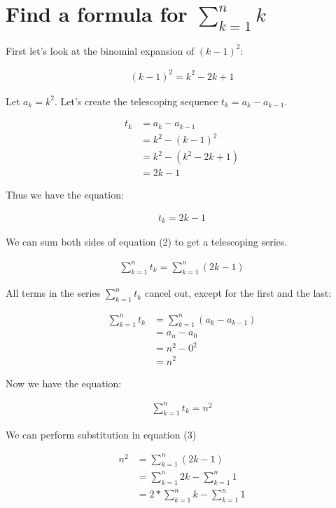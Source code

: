 \documentclass{article}
\begin{document}
\section{Find a formula for $\sum_{k=1}^{n} k$}
\begin{flushleft}
First let's look at the binomial expansion of $(k-1)^2$:
\end{flushleft}
\begin{align}
(k-1)^2 = k^2 - 2k + 1 
\end{align}
\begin{flushleft}
Let $a_{k} = k^2$. Let's create the telescoping sequence $t_{k} = a_{k} - a_{k-1}$.
\end{flushleft}
\begin{align*}
t_{k} &= a_{k}-a_{k-1} \\
&= k^2 - (k-1)^2 \\
&= k^2 - (k^2 - 2k + 1) \\
&= 2k -1
\end{align*}
\begin{flushleft}
Thus we have the equation:
\end{flushleft}
\begin{align}
t_{k} = 2k - 1 
\end{align}
\begin{flushleft}
We can sum both sides of equation (2) to get a telescoping series.
\end{flushleft}
\begin{align}
\sum_{k=1}^{n} t_{k} = \sum_{k=1}^{n} (2k-1)
\end{align}
\begin{flushleft}
All terms in the series $\sum_{k=1}^{n} t_{k}$ cancel out, except for the first and the last:
\end{flushleft}
\begin{align*}
\sum_{k=1}^{n} t_{k} &= \sum_{k=1}^{n} (a_{k} - a_{k-1}) \\
&= a_{n} - a_{0} \\
&= n^2 - 0^2 \\
&= n^2
\end{align*}
\begin{flushleft}
Now we have the equation:
\end{flushleft}
\begin{align}
\sum_{k=1}^{n} t_{k} = n^2
\end{align}
\begin{flushleft}
We can perform substitution in equation (3)
\end{flushleft}
\begin{align*}
n^2 &= \sum_{k=1}^{n} (2k-1) \\
       &= \sum_{k=1}^{n} 2k - \sum_{k=1}^{n} 1 \\
       &= 2 * \sum_{k=1}^{n} k - \sum_{k=1}^{n} 1
\end{align*}
\end{document}
